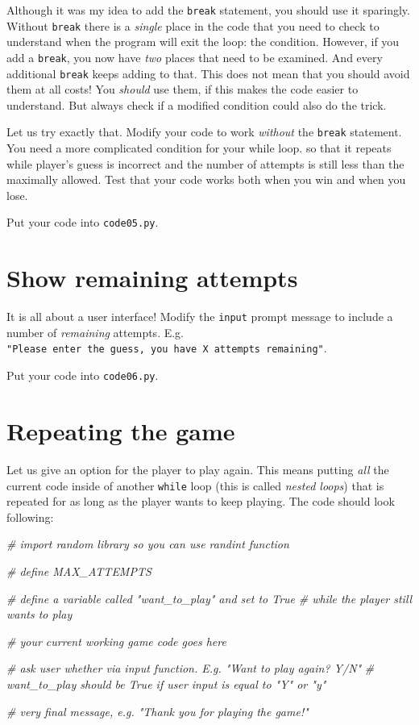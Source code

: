 \documentclass[
]{book}
\newenvironment{Shaded}{\begin{snugshade}}{\end{snugshade}}
\newcommand{\CommentTok}[1]{\textcolor[rgb]{0.56,0.35,0.01}{\textit{#1}}}
\begin{document}
Although it was my idea to add the \texttt{break} statement, you should use it sparingly. Without \texttt{break} there is a \emph{single} place in the code that you need to check to understand when the program will exit the loop: the condition. However, if you add a \texttt{break}, you now have \emph{two} places that need to be examined. And every additional \texttt{break} keeps adding to that. This does not mean that you should avoid them at all costs! You \emph{should} use them, if this makes the code easier to understand. But always check if a modified condition could also do the trick.

Let us try exactly that. Modify your code to work \emph{without} the \texttt{break} statement. You need a more complicated condition for your while loop. so that it repeats while player's guess is incorrect and the number of attempts is still less than the maximally allowed. Test that your code works both when you win and when you lose.

Put your code into \texttt{code05.py}.

\hypertarget{show-remaining-attempts}{%
\section{Show remaining attempts}\label{show-remaining-attempts}}

It is all about a user interface! Modify the \texttt{input} prompt message to include a number of \emph{remaining} attempts. E.g. \texttt{"Please\ enter\ the\ guess,\ you\ have\ X\ attempts\ remaining"}.

Put your code into \texttt{code06.py}.

\hypertarget{guess-the-number-repeat-game}{%
\section{Repeating the game}\label{guess-the-number-repeat-game}}

Let us give an option for the player to play again. This means putting \emph{all} the current code inside of another \texttt{while} loop (this is called \emph{nested loops}) that is repeated for as long as the player wants to keep playing. The code should look following:

\begin{Shaded}
\begin{Highlighting}[]
\CommentTok{\# import random library so you can use randint function}

\CommentTok{\# define MAX\_ATTEMPTS}

\CommentTok{\# define a variable called "want\_to\_play" and set to True}
\CommentTok{\# while the player still wants to play}
  
  \CommentTok{\# your current working game code goes here}
  
  \CommentTok{\# ask user whether via input function. E.g. "Want to play again? Y/N"}
  \CommentTok{\# want\_to\_play should be True if user input is equal to "Y" or "y"}
  
\CommentTok{\# very final message, e.g. "Thank you for playing the game!"}
\end{Highlighting}
\end{Shaded}
\end{document}
